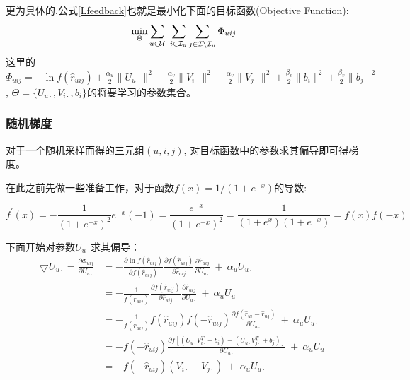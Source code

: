 更为具体的,公式\eqref{Lfeedback}也就是最小化下面的目标函数(Objective Function): 
\begin{equation}
\label{eq8}
\min_{\substack\Theta}\sum_{u\in\mathcal{U}} \ \sum_{i\in\mathcal{I}_u}\sum_{j\in\mathcal{I}\setminus\mathcal{I}_u}\Phi_{uij}
\end{equation}
这里的
$\Phi_{uij}
= 
- \ln f \left(\hat{r}_{uij}\right) 
+ \frac{\alpha_u}{2}\|U_{u\cdot}\|^2
+ \frac{\alpha_v}{2}\|V_{i\cdot}\|^2
+ \frac{\alpha_v}{2}\|V_{j\cdot}\|^2
+ \frac{\beta_v}{2}\|b_{i}\|^2
+ \frac{\beta_v}{2}\|b_{j}\|^2$, $\Theta = \{U_{u\cdot},V_{i\cdot},b_i\}
$的将要学习的参数集合。


\subsubsection{随机梯度}
对于一个随机采样而得的三元组$\left(u,i,j\right)$, 对目标函数中的参数求其偏导即可得梯度。

在此之前先做一些准备工作，对于函数$f(x) = 1/\left(1+e^{-x}\right)$的导数:

\begin{equation*}
f^{'}(x) = -\frac{1}{\left(1+e^{-x}\right)^2} e^{-x}\left(-1\right) = \frac{e^{-x}}{\left(1+e^{-x}\right)^2} = \frac{1}{\left(1+e^{x}\right)\left(1+e^{-x}\right)} = {f(x)f(-x)}
\end{equation*}

下面开始对参数$U_{u\cdot}$求其偏导：
\begin{equation}
\begin{aligned}
\bigtriangledown U_{u\cdot} 
= \frac{\partial \Phi_{uij}}{\partial U_{u\cdot}}
&=-\frac{\partial \ln f\left(\hat{r}_{uij}\right)}{\partial f\left(\hat{r}_{uij}\right)} 
\frac{\partial f\left(\hat{r}_{uij}\right) }{\partial \hat{r}_{uij}} 
\frac{\partial \hat{r}_{uij}}{\partial U_{u\cdot}}
\ + \  \alpha_uU_{u\cdot}\\
&= -\frac{1}{f\left(\hat{r}_{uij}\right)} 
\frac{\partial f\left(\hat{r}_{uij}\right) }{\partial \hat{r}_{uij}} 
\frac{\partial \hat{r}_{uij}}{\partial U_{u\cdot}}
\ + \  \alpha_uU_{u\cdot}\\
&= -\frac{1}{f\left(\hat{r}_{uij}\right)} 
{f\left(\hat{r}_{uij}\right) f\left(-\hat{r}_{uij}\right)}
\frac{\partial f\left(\hat{r}_{ui} - \hat{r}_{uj}\right) }{\partial U_{u\cdot}} 
\ + \ \alpha_uU_{u\cdot}\\
&= -{f\left(-\hat{r}_{uij}\right)} \frac{\partial f\left[\left(U_{u\cdot}V_{i\cdot}^T+b_i\right) - \left(U_{u\cdot}V_{j\cdot}^T+b_j\right)\right] }{\partial U_{u\cdot}} 
\ + \ \alpha_uU_{u\cdot}\\
&= -{f\left(-\hat{r}_{uij}\right)} \left(V_{i\cdot} - V_{j\cdot}\right)  
\ + \  \alpha_uU_{u\cdot}\\
\end{aligned}
\end{equation}

